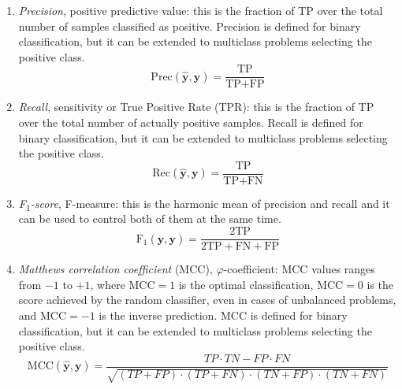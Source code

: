 \begin{enumerate}
\begin{enumerate}[label=(\roman*)]
    			\item \textit{Precision}, \aka positive predictive value: this is the fraction of TP over the total number of samples classified as positive. Precision is defined for binary classification, but it can be extended to multiclass problems selecting the positive class.
    			\begin{equation} \label{eq:metrics_precision}
    			\text{Prec} (\bm{\hat y}, \bm{y}) = \frac{\text{TP}}{\text{TP} + \text{FP}}
    			\end{equation}
    			
    			\item \textit{Recall}, \aka sensitivity or True Positive Rate (\ac{TPR}): this is the fraction of TP over the total number of actually positive samples. Recall is defined for binary classification, but it can be extended to multiclass problems selecting the positive class.
    			\begin{equation} \label{eq:metrics_recall}
    			\text{Rec}(\bm{\hat y}, \bm{y}) = \frac{\text{TP}}{\text{TP} + \text{FN}}
    			\end{equation}
    			
    			\item \textit{F\textsubscript{$1$}-score}, \aka F-measure: this is the harmonic mean of precision and recall and it can be used to control both of them at the same time.
    			\begin{equation} \label{eq:metrics_f1_score}
    			\text{F}_1(\bm{\hat y}, \bm{y}) = \frac{2 \text{TP}}{2 \text{TP} + \text{FN} + \text{FP}}
    			\end{equation}

    			\item \textit{Matthews correlation coefficient} (\ac{MCC}), \aka $\varphi$-coefficient: MCC values ranges from $-1$ to $+1$, where $\text{MCC} = 1$ is the optimal classification,  $\text{MCC} = 0$ is the score achieved by the random classifier, even in cases of unbalanced problems, and $\text{MCC} = -1$ is the inverse prediction.
    			MCC is defined for binary classification, but it can be extended to multiclass problems selecting the positive class.
    			\begin{equation} \label{eq:metrics_mcc}
    			\text{MCC}(\bm{\hat y}, \bm{y}) = \frac{TP \cdot TN - FP \cdot FN}{\sqrt{(TP+FP) \cdot (TP + FN) \cdot (TN + FP) \cdot (TN + FN)}}
    			\end{equation}
    			

\end{enumerate}
\end{enumerate}
